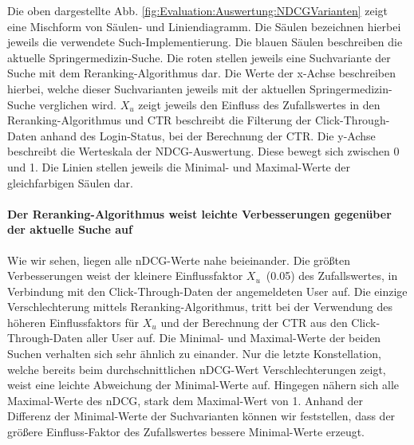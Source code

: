 Die oben dargestellte Abb. \ref{fig:Evaluation:Auswertung:NDCGVarianten} zeigt eine Mischform von Säulen- und Liniendiagramm. Die Säulen bezeichnen hierbei jeweils die verwendete Such-Implementierung. Die blauen Säulen beschreiben die aktuelle Springermedizin-Suche. Die roten stellen jeweils eine Suchvariante der Suche mit dem Reranking-Algorithmus dar. Die Werte der x-Achse beschreiben hierbei, welche dieser Suchvarianten jeweils mit der aktuellen Springermedizin-Suche verglichen wird. $X_u$ zeigt jeweils den Einfluss des Zufallswertes in den Reranking-Algorithmus und CTR beschreibt die Filterung der Click-Through-Daten anhand des Login-Status, bei der Berechnung der CTR. Die y-Achse beschreibt die Werteskala der NDCG-Auswertung. Diese bewegt sich zwischen 0 und 1. Die Linien stellen jeweils die Minimal- und Maximal-Werte der gleichfarbigen Säulen dar.

\paragraph{Der Reranking-Algorithmus weist leichte Verbesserungen gegenüber der aktuelle Suche auf}
Wie wir sehen, liegen alle nDCG-Werte nahe beieinander. Die größten Verbesserungen weist der kleinere Einflussfaktor $X_u$~(0.05) des Zufallswertes, in Verbindung mit den Click-Through-Daten der angemeldeten User auf. Die einzige Verschlechterung mittels Reranking-Algorithmus, tritt bei der Verwendung des höheren Einflussfaktors für $X_u$ und der Berechnung der CTR aus den Click-Through-Daten aller User auf. Die Minimal- und Maximal-Werte der beiden Suchen verhalten sich sehr ähnlich zu einander. Nur die letzte Konstellation, welche bereits beim durchschnittlichen nDCG-Wert Verschlechterungen zeigt, weist eine leichte Abweichung der Minimal-Werte auf. Hingegen nähern sich alle Maximal-Werte des nDCG, stark dem Maximal-Wert von 1. Anhand der Differenz der Minimal-Werte der Suchvarianten können wir feststellen, dass der größere Einfluss-Faktor des Zufallswertes bessere Minimal-Werte erzeugt.